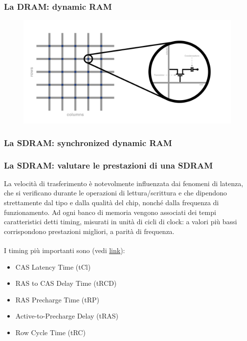 \begin{frame}
	\frametitle{La DRAM: dynamic RAM}
	 
	\begin{figure}[!htbp] 
		\centering
		\includegraphics[width=1.0\linewidth]{images/5_memory/dram_matrix_3.pdf}
	\end{figure}
	
\end{frame}

\subsubsection[La SDRAM: synchronized dynamic RAM]{La SDRAM: synchronized dynamic RAM}
\begin{frame}
	\frametitle{La SDRAM: valutare le prestazioni di una SDRAM}
	
	\begin{block}{}
		La velocità di trasferimento è notevolmente influenzata dai fenomeni di latenza, che si verificano durante le operazioni di lettura/scrittura e che dipendono strettamente dal tipo e dalla qualità del chip, nonché dalla frequenza di funzionamento. Ad ogni banco di memoria vengono associati dei tempi caratteristici detti timing, misurati in unità di cicli di clock: a valori più bassi corrispondono prestazioni migliori, a parità di frequenza.\\~\\
		
		I timing più importanti sono (vedi \href{https://it.wikipedia.org/wiki/DDR\_SDRAM}{link}):
		\begin{itemize}
			\item CAS Latency Time (tCl)
			\item RAS to CAS Delay Time (tRCD)
			\item RAS Precharge Time (tRP)
			\item Active-to-Precharge Delay (tRAS)
			\item Row Cycle Time (tRC)
		\end{itemize}
		
	\end{block}

	
	
\end{frame}


